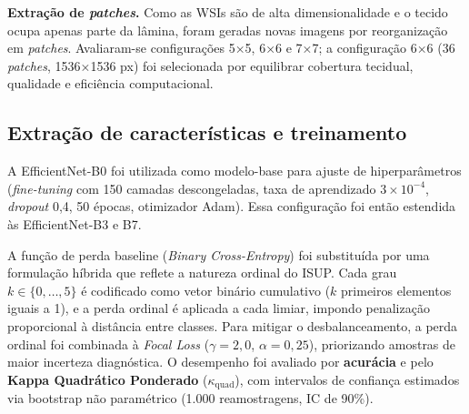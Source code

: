 \textbf{Extração de \textit{patches}.} Como as WSIs são de alta dimensionalidade e o tecido ocupa apenas parte da lâmina, foram geradas novas imagens por reorganização em \textit{patches}. Avaliaram-se configurações 5×5, 6×6 e 7×7; a configuração 6×6 (36 \textit{patches}, 1536×1536 px) foi selecionada por equilibrar cobertura tecidual, qualidade e eficiência computacional.

\subsection{Extração de características e treinamento}

A EfficientNet-B0 foi utilizada como modelo-base para ajuste de hiperparâmetros (\textit{fine-tuning} com 150 camadas descongeladas, taxa de aprendizado $3\times10^{-4}$, \textit{dropout} 0,4, 50 épocas, otimizador Adam). Essa configuração foi então estendida às EfficientNet-B3 e B7.

A função de perda baseline (\textit{Binary Cross-Entropy}) foi substituída por uma formulação híbrida que reflete a natureza ordinal do ISUP. Cada grau $k \in \{0,\dots,5\}$ é codificado como vetor binário cumulativo ($k$ primeiros elementos iguais a 1), e a perda ordinal é aplicada a cada limiar, impondo penalização proporcional à distância entre classes. Para mitigar o desbalanceamento, a perda ordinal foi combinada à \textit{Focal Loss} \cite{lin2017focal} ($\gamma = 2{,}0$, $\alpha = 0{,}25$), priorizando amostras de maior incerteza diagnóstica. O desempenho foi avaliado por \textbf{acurácia} e pelo \textbf{Kappa Quadrático Ponderado} ($\kappa_{\text{quad}}$), com intervalos de confiança estimados via bootstrap não paramétrico (1.000 reamostragens, IC de 90\%).
